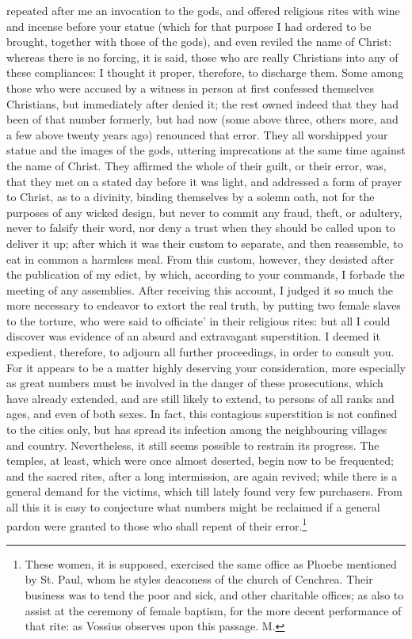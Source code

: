 repeated after me an invocation to the gods, and offered religious rites
with wine and incense before your statue (which for that purpose I had
ordered to be brought, together with those of the gods), and even reviled
the name of Christ: whereas there is no forcing, it is said, those who are
really Christians into any of these compliances: I thought it proper,
therefore, to discharge them. Some among those who were accused by a
witness in person at first confessed themselves Christians, but
immediately after denied it; the rest owned indeed that they had been of
that number formerly, but had now (some above three, others more, and a
few above twenty years ago) renounced that error. They all worshipped your
statue and the images of the gods, uttering imprecations at the same time
against the name of Christ. They affirmed the whole of their guilt, or
their error, was, that they met on a stated day before it was light, and
addressed a form of prayer to Christ, as to a divinity, binding themselves
by a solemn oath, not for the purposes of any wicked design, but never to
commit any fraud, theft, or adultery, never to falsify their word, nor
deny a trust when they should be called upon to deliver it up; after which
it was their custom to separate, and then reassemble, to eat in common a
harmless meal. From this custom, however, they desisted after the
publication of my edict, by which, according to your commands, I forbade
the meeting of any assemblies. After receiving this account, I judged it
so much the more necessary to endeavor to extort the real truth, by
putting two female slaves to the torture, who were said to officiate' in
their religious rites: but all I could discover was evidence of an absurd
and extravagant superstition. I deemed it expedient, therefore, to adjourn
all further proceedings, in order to consult you. For it appears to be a
matter highly deserving your consideration, more especially as great
numbers must be involved in the danger of these prosecutions, which have
already extended, and are still likely to extend, to persons of all ranks
and ages, and even of both sexes. In fact, this contagious superstition is
not confined to the cities only, but has spread its infection among the
neighbouring villages and country. Nevertheless, it still seems possible
to restrain its progress. The temples, at least, which were once almost
deserted, begin now to be frequented; and the sacred rites, after a long
intermission, are again revived; while there is a general demand for the
victims, which till lately found very few purchasers. From all this it is
easy to conjecture what numbers might be reclaimed if a general pardon
were granted to those who shall repent of their error.\footnote{These women, it is
supposed, exercised the same office as Phoebe mentioned by St. Paul, whom
he styles deaconess of the church of Cenchrea. Their business was to tend
the poor and sick, and other charitable offices; as also to assist at the
ceremony of female baptism, for the more decent performance of that rite:
as Vossius observes upon this passage. M.}

